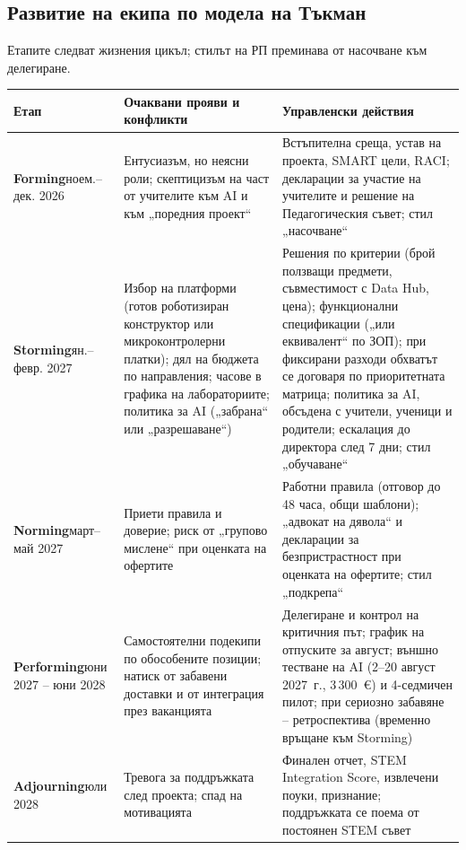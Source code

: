 \documentclass[11pt,a4paper]{article}
\renewcommand{\arraystretch}{1.15}
\begin{document}
\subsection{Развитие на екипа по модела на Тъкман}

Етапите следват жизнения цикъл; стилът на РП преминава от насочване към делегиране.

{\footnotesize
\setlength{\tabcolsep}{4pt}
\renewcommand{\arraystretch}{1.08}
\begin{xltabular}{\textwidth}{@{}>{\raggedright\arraybackslash}p{1.85cm}>{\raggedright\arraybackslash}p{5.2cm}>{\raggedright\arraybackslash}X@{}}
\toprule
\textbf{Етап} & \textbf{Очаквани прояви и конфликти} & \textbf{Управленски действия}\\
\midrule
\endhead
\textbf{Forming}\newline ноем.–дек. 2026 & Ентусиазъм, но неясни роли; скептицизъм на част от учителите към AI и към „поредния проект“ & Встъпителна среща, устав на проекта, SMART цели, RACI; декларации за участие на учителите и решение на Педагогическия съвет; стил „насочване“\\
\textbf{Storming}\newline ян.–февр. 2027 & Избор на платформи (готов роботизиран конструктор или микроконтролерни платки); дял на бюджета по направления; часове в графика на лабораториите; политика за AI („забрана“ или „разрешаване“) & Решения по критерии (брой ползващи предмети, съвместимост с Data Hub, цена); функционални спецификации („или еквивалент“ по ЗОП); при фиксирани разходи обхватът се договаря по приоритетната матрица; политика за AI, обсъдена с учители, ученици и родители; ескалация до директора след 7 дни; стил „обучаване“\\
\textbf{Norming}\newline март–май 2027 & Приети правила и доверие; риск от „групово мислене“ при оценката на офертите & Работни правила (отговор до 48 часа, общи шаблони); „адвокат на дявола“ и декларации за безпристрастност при оценката на офертите; стил „подкрепа“\\
\textbf{Performing}\newline юни 2027 – юни 2028 & Самостоятелни подекипи по обособените позиции; натиск от забавени доставки и от интеграция през ваканцията & Делегиране и контрол на критичния път; график на отпуските за август; външно тестване на AI (2–20 август 2027~г., 3\,300~€) и 4-седмичен пилот; при сериозно забавяне – ретроспектива (временно връщане към Storming)\\
\textbf{Adjourning}\newline юли 2028 & Тревога за поддръжката след проекта; спад на мотивацията & Финален отчет, STEM Integration Score, извлечени поуки, признание; поддръжката се поема от постоянен STEM съвет\\
\bottomrule
\end{xltabular}}
\end{document}
